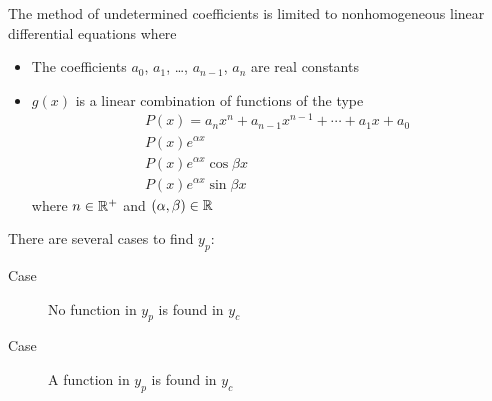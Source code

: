\documentclass[10pt, twocolumn]{article}
\theoremstyle{definition}
\begin{document}
The method of undetermined coefficients is limited to nonhomogeneous linear differential equations where
\begin{itemize}
  \item The coefficients \(a_0 \), \(a_1 \), \dots, \(a_{n - 1}\), \(a_n \) are real constants
  \item \(g(x)\) is a linear combination of functions of the type
        \begin{align*}
           & P(x) = a_n x^n + a_{n - 1} x^{n - 1} + \cdots + a_1 x + a_0 \\
           & P(x)e^{\alpha x}                                            \\
           & P(x)e^{\alpha x}\cos{\beta x}                               \\
           & P(x)e^{\alpha x}\sin{\beta x}
        \end{align*}
        where \(n \in \mathbb{R}^+ \) and \((\alpha, \beta) \in \mathbb{R}\)
\end{itemize}

There are several cases to find \(y_p \):
\begin{description}
  \item[Case ] No function in \(y_p \) is found in \(y_c \)
  \item[Case ] A function in \(y_p \) is found in \(y_c \)
\end{description}
\end{document}
